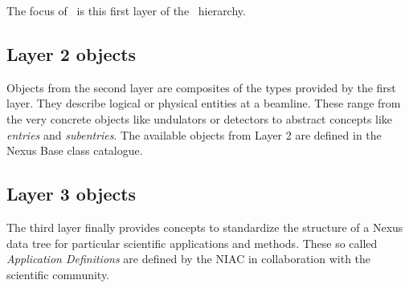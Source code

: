 The focus of \libpniio\ is this first layer of the \nexus\ hierarchy.

\subsection{Layer 2 objects}

Objects from the second layer are composites of the types provided by the first
layer. They describe logical or physical entities at a beamline. 
These range from the very concrete objects like undulators or detectors to
abstract concepts like \emph{entries} and \emph{subentries}. 
The available objects from Layer 2 are defined in the Nexus Base class
catalogue.


\subsection{Layer 3 objects}

The third layer finally provides concepts to standardize the structure of a
Nexus data tree for particular scientific applications and methods. 
These so called \emph{Application Definitions} are defined by the NIAC in
collaboration with the scientific community.


